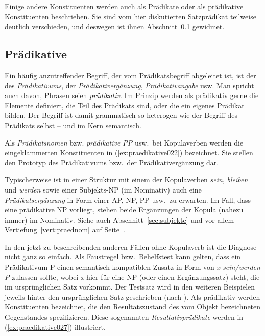 Einige andere Konstituenten werden auch als Prädikate oder als prädikative Konstituenten beschrieben.
Sie sind vom hier diskutierten Satzprädikat teilweise deutlich verschieden, und deswegen ist ihnen Abschnitt~\ref{sec:praedikative} gewidmet.

\subsection{Prädikative}
\label{sec:praedikative}

Ein häufig anzutreffender Begriff, der vom Prädikatsbegriff abgeleitet ist, ist der des \textit{Prädikativums}, der \textit{Prädikativergänzung}, \textit{Prädikativangabe} usw.
Man spricht auch davon, Phrasen seien \textit{prädikativ}.
Im Prinzip werden als prädikativ gerne die Elemente definiert, die Teil des Prädikats sind, oder die ein eigenes Prädikat bilden.
Der Begriff ist damit grammatisch so heterogen wie der Begriff des Prädikats selbst -- und im Kern semantisch.


Als \textit{Prädikatsnomen} bzw. \textit{prädikative PP} usw.\ bei Kopulaverben werden die eingeklammerten Konstituenten in (\ref{ex:praedikative022}) bezeichnet.
Sie stellen den Prototyp des Prädikativums bzw.\ der Prädikativergänzung dar.

\begin{exe}
  \ex\label{ex:praedikative022}
  \begin{xlist}
  \end{xlist}
\end{exe}

Typischerweise ist in einer Struktur mit einem der Kopulaverben \textit{sein}, \textit{bleiben} und \textit{werden} sowie einer Subjekts-NP (im Nominativ) auch eine \textit{Prädikatsergänzung} in Form einer AP, NP, PP usw.\ zu erwarten.
Im Fall, dass eine prädikative NP vorliegt, stehen beide Ergänzungen der Kopula (nahezu immer) im Nominativ.
Siehe auch Abschnitt~\ref{sec:subjekte} und vor allem Vertiefung~\ref{vert:praednom} auf Seite~\pageref{vert:praednom}.

In den jetzt zu beschreibenden anderen Fällen ohne Kopulaverb ist die Diagnose nicht ganz so einfach.
Als Faustregel bzw.\ Behelfstest kann gelten, dass ein Prädikativum P einen semantisch kompatiblen Zusatz in Form von \textit{x sein/werden P} zulassen sollte, wobei \textit{x} hier für eine NP (oder einen Ergänzungssatz) steht, die im ursprünglichen Satz vorkommt.
Der Testsatz wird in den weiteren Beispielen jeweils hinter den ursprünglichen Satz geschrieben (nach \Folgt).
Als prädikativ werden \zB Konstituenten bezeichnet, die den Resultatszustand des vom Objekt bezeichneten Gegenstandes spezifizieren.
Diese sogenannten \textit{Resultativprädikate} werden in (\ref{ex:praedikative027}) illustriert.

